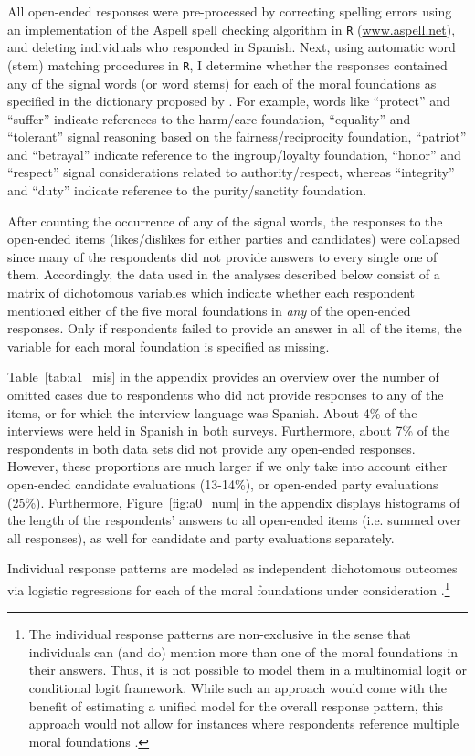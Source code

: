 \documentclass[12pt]{article}
\begin{document}
All open-ended responses were pre-processed by correcting spelling errors using an implementation of the Aspell spell checking algorithm in \texttt{R} (\url{www.aspell.net}), and deleting individuals who responded in Spanish. Next, using automatic word (stem) matching procedures in \texttt{R}, I determine whether the responses contained any of the signal words (or word stems) for each of the moral foundations as specified in the dictionary proposed by \citet[][the word lists are also presented in Appendix~\ref{app:oview}]{graham2009liberals}. For example, words like ``protect'' and ``suffer'' indicate references to the harm/care foundation, ``equality'' and ``tolerant'' signal reasoning based on the fairness/reciprocity foundation, ``patriot'' and ``betrayal'' indicate reference to the ingroup/loyalty foundation, ``honor'' and ``respect'' signal considerations related to authority/respect, whereas ``integrity'' and ``duty'' indicate reference to the purity/sanctity foundation.

After counting the occurrence of any of the signal words, the responses to the open-ended items (likes/dislikes for either parties and candidates) were collapsed since many of the respondents did not provide answers to every single one of them. Accordingly, the data used in the analyses described below consist of a matrix of dichotomous variables which indicate whether each respondent mentioned either of the five moral foundations in \textit{any} of the open-ended responses. Only if respondents failed to provide an answer in all of the items, the variable for each moral foundation is specified as missing.

Table~\ref{tab:a1_mis} in the appendix provides an overview over the number of omitted cases due to respondents who did not provide responses to any of the items, or for which the interview language was Spanish. About 4\% of the interviews were held in Spanish in both surveys. Furthermore, about 7\% of the respondents in both data sets did not provide any open-ended responses. However, these proportions are much larger if we only take into account either open-ended candidate evaluations (13-14\%), or open-ended party evaluations (25\%). Furthermore, Figure~\ref{fig:a0_num} in the appendix displays histograms of the length of the respondents' answers to all open-ended items (i.e. summed over all responses), as well for candidate and party evaluations separately.

Individual response patterns are modeled as independent dichotomous outcomes via logistic regressions for each of the moral foundations under consideration \citep[c.f. for example][]{agresti1999modeling}.\footnote{The individual response patterns are non-exclusive in the sense that individuals can (and do) mention more than one of the moral foundations in their answers. Thus, it is not possible to model them in a multinomial logit or conditional logit framework. While such an approach would come with the benefit of estimating a unified model for the overall response pattern, this approach would not allow for instances where respondents reference multiple moral foundations \citep[but see][]{gilbert2007models}.}
\end{document}
